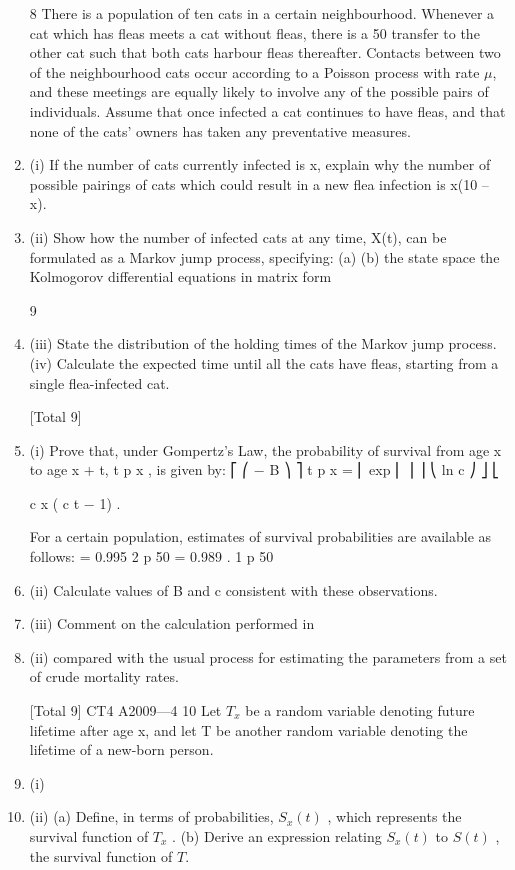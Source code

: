 \documentclass[a4paper,12pt]{article}
\begin{document}
\begin{enumerate}


8
There is a population of ten cats in a certain neighbourhood. Whenever a cat which has fleas meets a cat without fleas, there is a 50%
transfer to the other cat such that both cats harbour fleas thereafter. Contacts between two of the neighbourhood cats occur according to a Poisson process with rate $\mu$, and these meetings are equally likely to involve any of the possible pairs of individuals.
Assume that once infected a cat continues to have fleas, and that none of the cats’ owners has taken any preventative measures.
\item (i) If the number of cats currently infected is x, explain why the number of possible pairings of cats which could result in a new flea infection is x(10 – x).

\item (ii) Show how the number of infected cats at any time, X(t), can be formulated as
a Markov jump process, specifying:
(a)
(b)
the state space
the Kolmogorov differential equations in matrix form

9
\item (iii) State the distribution of the holding times of the Markov jump process.
(iv) Calculate the expected time until all the cats have fleas, starting from a single
flea-infected cat.

[Total 9]



\item (i) Prove that, under Gompertz’s Law, the probability of survival from age x to
age x + t, t p x , is given by:
⎡
⎛ − B ⎞ ⎤
t p x = ⎢ exp ⎜
⎟ ⎥
⎝ ln c ⎠ ⎦
⎣

c x ( c t − 1)
.

For a certain population, estimates of survival probabilities are available as follows:
= 0.995
2 p 50 = 0.989 .
1 p 50
\item (ii) Calculate values of B and c consistent with these observations.
\item (iii) Comment on the calculation performed in \item (ii) compared with the usual process
for estimating the parameters from a set of crude mortality rates.

[Total 9]
CT4 A2009—4
10
Let $T_x$ be a random variable denoting future lifetime after age x, and let T be
another random variable denoting the lifetime of a new-born person.
\item (i)
\item (ii)
(a) Define, in terms of probabilities, $S_x(t)$ , which represents the survival
function of $T_x$ .
(b) Derive an expression relating $S_x(t)$ to $S ( t )$ , the survival function of $T$.


\end{enumerate}
\end{document}
